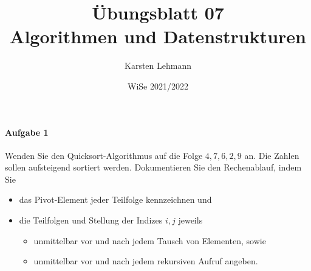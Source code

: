 \documentclass{scrreprt}
\author{Karsten Lehmann}
\date{WiSe 2021/2022}
\title{Übungsblatt 07\\Algorithmen und Datenstrukturen}
\begin{document}
\paragraph{Aufgabe 1} Wenden Sie den Quicksort-Algorithmus auf die Folge
$4, 7, 6, 2, 9$ an.
Die Zahlen sollen aufsteigend sortiert werden.
Dokumentieren Sie den Rechenablauf, indem Sie
\begin{itemize}
\item das Pivot-Element jeder Teilfolge kennzeichnen und
\item die Teilfolgen und Stellung der Indizes $i, j$ jeweils
  \begin{itemize}
  \item unmittelbar vor und nach jedem Tausch von Elementen, sowie
  \item unmittelbar vor und nach jedem rekursiven Aufruf angeben.
  \end{itemize}
\end{itemize}
\end{document}
